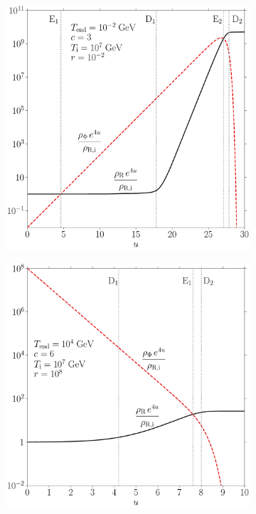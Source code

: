 \documentclass[11pt,a4paper]{article}
\begin{document}
\begin{center}
	\begin{figure}[t!]
		\begin{subfigure}{0.5\textwidth}
			\includegraphics[width=1\textwidth]{figs/EMD.pdf}
			\caption{}
			\label{fig:EMD}
		\end{subfigure}
		\begin{subfigure}{0.5\textwidth}
			\includegraphics[width=1\textwidth]{figs/EKD.pdf}
			\caption{}
			\label{fig:EKD}
		\end{subfigure}
		\caption{}
		\label{fig:evolution_examples}
	\end{figure}
\end{center}
\end{document}
